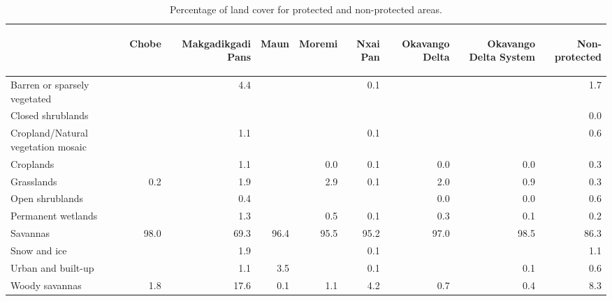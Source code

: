 \begin{table}[H]
\centering
\caption[Percentage of LC 
                                           for protected and non-protected 
                                           areas, Ngamiland]{Percentage of land cover 
                                           for protected and non-protected 
                                           areas.} 
\label{table:mlc_percentage_wdpa_BWA}
\begin{tabular}{lrrrrrrrr}
  \toprule
\begin{sideways}  \end{sideways} & \begin{sideways} Chobe \end{sideways} & \begin{sideways} Makgadikgadi Pans \end{sideways} & \begin{sideways} Maun \end{sideways} & \begin{sideways} Moremi \end{sideways} & \begin{sideways} Nxai Pan \end{sideways} & \begin{sideways} Okavango Delta \end{sideways} & \begin{sideways} Okavango Delta System \end{sideways} & \begin{sideways} Non-protected \end{sideways} \\ 
  \midrule
Barren or sparsely vegetated &  & 4.4 &  &  & 0.1 &  &  & 1.7 \\ 
  Closed shrublands &  &  &  &  &  &  &  & 0.0 \\ 
  Cropland/Natural vegetation mosaic &  & 1.1 &  &  & 0.1 &  &  & 0.6 \\ 
  Croplands &  & 1.1 &  & 0.0 & 0.1 & 0.0 & 0.0 & 0.3 \\ 
  Grasslands & 0.2 & 1.9 &  & 2.9 & 0.1 & 2.0 & 0.9 & 0.3 \\ 
  Open shrublands &  & 0.4 &  &  &  & 0.0 & 0.0 & 0.6 \\ 
  Permanent wetlands &  & 1.3 &  & 0.5 & 0.1 & 0.3 & 0.1 & 0.2 \\ 
  Savannas & 98.0 & 69.3 & 96.4 & 95.5 & 95.2 & 97.0 & 98.5 & 86.3 \\ 
  Snow and ice &  & 1.9 &  &  & 0.1 &  &  & 1.1 \\ 
  Urban and built-up &  & 1.1 & 3.5 &  & 0.1 &  & 0.1 & 0.6 \\ 
  Woody savannas & 1.8 & 17.6 & 0.1 & 1.1 & 4.2 & 0.7 & 0.4 & 8.3 \\ 
   \bottomrule
\end{tabular}
\end{table}
